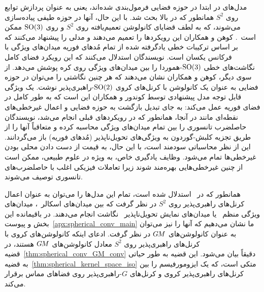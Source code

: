 مدل‌های \cite{Cohen2018-S2CNN,esteves2018zonalSpherical,esteves2020spinweighted} در ابتدا در حوزه فضایی فرمول‌بندی شده‌اند، یعنی به عنوان پردازش توابع روی $S^2$ همانطور که در بالا بحث شد.
با این حال، آنها در حوزه طیفی پیاده‌سازی می‌شوند، که به لطف قضایای کانولوشن تعمیم‌یافته روی $S^2$ و روی $\operatorname{SO}(3)$ ممکن است~\cite{makadia2006rotation,Kondor2018-GENERAL,vilenkin2013representation}.
کوهن و همکاران\cite{kondor2018ClebschGordan}  این رویکردها را تعمیم می‌دهند و مدلی را پیشنهاد می‌کنند که بر اساس ترکیبات خطی یادگرفته شده از تمام مُدهای فوریه میدان‌های ویژگی با فرکانس یکسان است.
نویسندگان استدلال می‌کنند که این رویکرد فضای کامل نگاشت‌های خطی $\operatorname{SO}(3)$-هموردا را بین میدان‌های ویژگی روی کره پوشش می‌دهد.
از سوی دیگر، کوهن و همکاران\cite{Cohen2019-generaltheory} نشان می‌دهند که هر چنین نگاشتی را می‌توان در حوزه فضایی به عنوان یک کانولوشن با کرنل‌های کروی $\operatorname{SO}(2)$-راهبری‌پذیر نوشت.
یک ویژگی قابل توجه مدل پیشنهادی توسط کوندور و همکاران\cite{kondor2018ClebschGordan} این است که به طور کامل در فضای فوریه عمل می‌کند:
به جای تبدیل بازگشت به حوزه فضایی و اعمال غیرخطی‌های نقطه‌ای مانند  در آنجا، همانطور که در رویکردهای قبلی انجام می‌شد، نویسندگان حاصلضرب تانسوری را بین تمام میدان‌های ویژگی محاسبه کرده و متعاقباً آنها را از طریق تجزیه کلبش-گوردون به ویژگی‌های تحویل‌ناپذیر (مُدهای فوریه) باز می‌گردانند.
این از نظر محاسباتی سودمند است، با این حال، به قیمت از دست دادن محلی بودن غیرخطی‌ها تمام می‌شود.
وظایف یادگیری خاص، به ویژه در علوم طبیعی، ممکن است از چنین غیرخطی‌هایی بهره‌مند شوند زیرا تعاملات فیزیکی اغلب با حاصلضرب‌های تانسوری توصیف می‌شوند.


همانطور که در~\cite{Cohen2019-generaltheory,Cohen2018-intertwiners} استدلال شده است، تمام این مدل‌ها را می‌توان به عنوان اعمال کرنل‌های راهبری‌پذیر روی $S^2$ در نظر گرفت که بین میدان‌های اسکالر~\cite{esteves2018zonalSpherical}، میدان‌های ویژگی منظم~\cite{Cohen2018-S2CNN} یا میدان‌های نمایش تحویل‌ناپذیر~\cite{esteves2020spinweighted,kondor2018ClebschGordan} نگاشت انجام می‌دهند.
در باقیمانده این بخش و پیوست~\ref{apx:spherical_conv_main} ما نشان می‌دهیم که آنها را نیز می‌توان به عنوان کانولوشن‌های $G\mkern-1.4muM$ در نظر گرفت.
ادعای اینکه کانولوشن‌های کروی با کرنل‌های راهبری‌پذیر روی $S^2$ معادل کانولوشن‌های $G\mkern-1.4muM$ هستند، در قضیه~\ref{thm:spherical_conv_GM_conv} دقیقاً بیان می‌شود.
این قضیه به طور حیاتی به قضیه~\ref{thm:spherical_kernel_space_iso} متکی است، که یک ایزومورفیسم را بین کرنل‌های راهبری‌پذیر کروی و کرنل‌های $G$-راهبری‌پذیر روی فضاهای مماس برقرار می‌کند.

